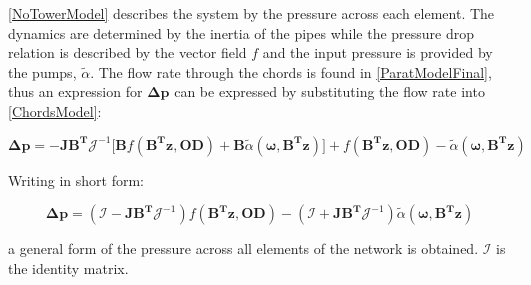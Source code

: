 \eqref{NoTowerModel} describes the system by the pressure across each element. The dynamics are determined by the inertia of the pipes while the pressure drop relation is described by the vector field $f$ and the input pressure is provided by the pumps, $\tilde\alpha$. 
The flow rate through the chords is found in \eqref{ParatModelFinal}, thus an expression for $ \bm{\Delta p} $ can be expressed by substituting the flow rate into \eqref{ChordsModel}: 

\begin{equation}
 \bm{\Delta p} =  -\bm{J} \bm{B^T}\bm{\mathcal{J}}^{-1} \Big[ \bm{B} f(\bm{B^T}\bm{z}, \bm{OD}) + \bm{B}\tilde{\alpha} (\bm{\omega},\bm{B^T}\bm{z}) \Big ] + f(\bm{B^T}\bm{z},\bm{OD}) - \tilde{\alpha} (\bm{\omega},\bm{B^T}\bm{z})
  \label{PressureLarge}
 \end{equation}
 
Writing in short form:
 
 \begin{equation}
  \bm{\Delta p} = (\bm{\mathcal{I}} - \bm{J} \bm{B^T}\bm{\mathcal{J}}^{-1} ) f(\bm{B^T}\bm{z}, \bm{OD}) - (\bm{\mathcal{I}} + \bm{J} \bm{B^T}\bm{\mathcal{J}}^{-1} ) \tilde{\alpha} (\bm{\omega},\bm{B^T}\bm{z})
  \label{PressureShort}
 \end{equation}

a general form of the pressure across all elements of the network is obtained. $\bm{\mathcal{I}}$ is the identity matrix. 


